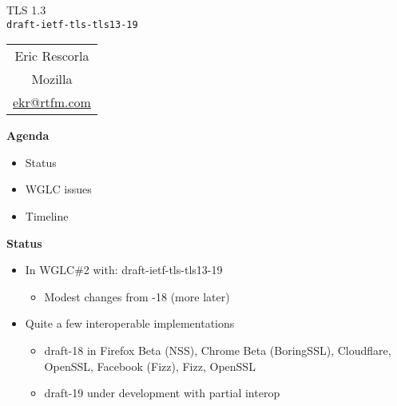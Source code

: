 \documentclass[helvetica]{seminar}
\newcommand{\heading}[1]{%
  \begin{center} 
    \large\bf 
    #1 
  \end{center} 
  \vspace{.4 in}}
\begin{document}
\begin{slide}
\begin{center}
\vspace{.5 in}
\LARGE{{\bf}TLS 1.3\\{\small \verb^draft-ietf-tls-tls13-19^}}\\
\vspace{.2in}
\large{
\begin{tabular}{c}
Eric Rescorla\\
Mozilla\\
\url{ekr@rtfm.com}
\end{tabular}
}
\end{center}
\end{slide}

\centerslidesfalse 

\begin{slide}
\heading{Agenda}

\begin{itemize}
\item Status
\item WGLC issues
\item Timeline
\end{itemize}

\end{slide}


\begin{slide}
\heading{Status}

\begin{itemize}
\item In WGLC\#2 with: draft-ietf-tls-tls13-19
  \begin{itemize}
  \item Modest changes from -18 (more later)
  \end{itemize}
\item Quite a few interoperable implementations
  \begin{itemize}
  \item draft-18 in Firefox Beta (NSS), Chrome Beta (BoringSSL), Cloudflare, OpenSSL, Facebook (Fizz), Fizz, OpenSSL
  \item draft-19 under development with partial interop
  \end{itemize}
\end{itemize}
\end{slide}
\end{document}
